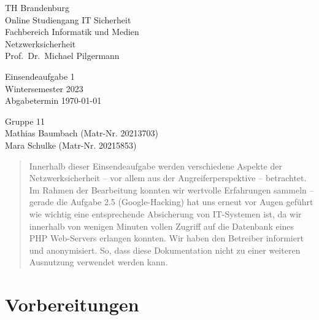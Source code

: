\documentclass{article}
\begin{document}
\begin{titlepage}
	\begin{flushleft}
		TH Brandenburg \\
		Online Studiengang IT Sicherheit \\
		Fachbereich Informatik und Medien \\
		Netzwerksicherheit \\
		Prof.\ Dr.\ Michael Pilgermann
	\end{flushleft}

	\vfill

	\begin{center}
		\Large{Einsendeaufgabe 1}\\[0.5em]
		\large{Wintersemester 2023}\\[0.25em]
		\large{Abgabetermin \today}
	\end{center}

	\vfill

	\begin{flushright}
		Gruppe 11 \\
		Mathias Baumbach (Matr-Nr. 20213703) \\
		Mara Schulke (Matr-Nr. 20215853)
	\end{flushright}
\end{titlepage}

\begin{abstract}
	Innerhalb dieser Einsendeaufgabe werden verschiedene Aspekte der Netzwerksicherheit – vor 
	allem aus der Angreiferperspektive – betrachtet. Im Rahmen der Bearbeitung konnten wir 
	wertvolle Erfahrungen sammeln – gerade die Aufgabe 2.5 (Google-Hacking) hat uns erneut vor 
	Augen geführt wie wichtig eine entsprechende Absicherung von IT-Systemen ist, da wir 
	innerhalb von wenigen Minuten vollen Zugriff auf die Datenbank eines PHP Web-Servers 
	erlangen konnten. Wir haben den Betreiber informiert und anonymisiert. So, dass diese 
	Dokumentation nicht zu einer weiteren Ausnutzung verwendet werden kann.
\end{abstract}

\tableofcontents

\listoffigures

\newpage

\section{Vorbereitungen}
\end{document}
